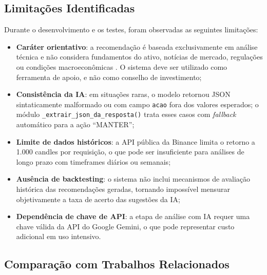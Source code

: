 \documentclass[conference]{IEEEtran}
\begin{document}
\subsection{Limitações Identificadas}

Durante o desenvolvimento e os testes, foram observadas as seguintes limitações:

\begin{itemize}
  \item \textbf{Caráter orientativo}: a recomendação é baseada exclusivamente em análise técnica e não considera fundamentos do ativo, notícias de mercado, regulações ou condições macroeconômicas \cite{pinheiro2019mercado}. O sistema deve ser utilizado como ferramenta de apoio, e não como conselho de investimento;
  \item \textbf{Consistência da IA}: em situações raras, o modelo retornou JSON sintaticamente malformado ou com campo \texttt{acao} fora dos valores esperados; o módulo \texttt{\_extrair\_json\_da\_resposta()} trata esses casos com \textit{fallback} automático para a ação ``MANTER'';
  \item \textbf{Limite de dados históricos}: a API pública da Binance limita o retorno a 1.000 candles por requisição, o que pode ser insuficiente para análises de longo prazo com timeframes diários ou semanais;
  \item \textbf{Ausência de backtesting}: o sistema não inclui mecanismos de avaliação histórica das recomendações geradas, tornando impossível mensurar objetivamente a taxa de acerto das sugestões da IA;
  \item \textbf{Dependência de chave de API}: a etapa de análise com IA requer uma chave válida da API do Google Gemini, o que pode representar custo adicional em uso intensivo.
\end{itemize}

\subsection{Comparação com Trabalhos Relacionados}
\end{document}
